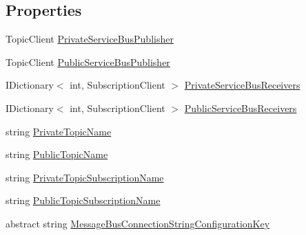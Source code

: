 \subsection*{Properties}
\begin{DoxyCompactItemize}
\item 
Topic\+Client \hyperlink{classCqrs_1_1Azure_1_1ServiceBus_1_1AzureServiceBus_a640c513528e0037de1813d134e4d0476}{Private\+Service\+Bus\+Publisher}
\item 
Topic\+Client \hyperlink{classCqrs_1_1Azure_1_1ServiceBus_1_1AzureServiceBus_a17195f3c8e05ec37dfac37a8e9e1b089}{Public\+Service\+Bus\+Publisher}
\item 
I\+Dictionary$<$ int, Subscription\+Client $>$ \hyperlink{classCqrs_1_1Azure_1_1ServiceBus_1_1AzureServiceBus_ac52e1a7e17f4ffb80f95d31424101aaa}{Private\+Service\+Bus\+Receivers}
\item 
I\+Dictionary$<$ int, Subscription\+Client $>$ \hyperlink{classCqrs_1_1Azure_1_1ServiceBus_1_1AzureServiceBus_ac73f294e6a99655f2ff7e391646f2e5d}{Public\+Service\+Bus\+Receivers}
\item 
string \hyperlink{classCqrs_1_1Azure_1_1ServiceBus_1_1AzureServiceBus_a7af8ebcdd25672ff2252085637904f82}{Private\+Topic\+Name}
\item 
string \hyperlink{classCqrs_1_1Azure_1_1ServiceBus_1_1AzureServiceBus_ac6f4fbafebcde04a8493462b688e0abe}{Public\+Topic\+Name}
\item 
string \hyperlink{classCqrs_1_1Azure_1_1ServiceBus_1_1AzureServiceBus_a22498d51bba26c801b3b553fb451a6ae}{Private\+Topic\+Subscription\+Name}
\item 
string \hyperlink{classCqrs_1_1Azure_1_1ServiceBus_1_1AzureServiceBus_adab1b2f0dc9f199d5f0aa60d57ba71c8}{Public\+Topic\+Subscription\+Name}
\item 
abstract string \hyperlink{classCqrs_1_1Azure_1_1ServiceBus_1_1AzureServiceBus_a2cde8078f7d4d9706dec5fb066359ee0}{Message\+Bus\+Connection\+String\+Configuration\+Key}

\end{DoxyCompactItemize}
